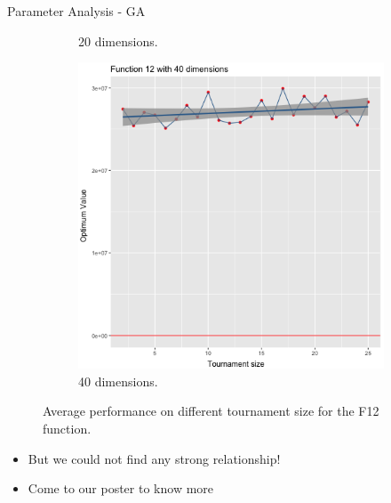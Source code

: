 \documentclass[10pt]{beamer}
\begin{document}
\begin{frame}{Parameter Analysis - GA}
\begin{figure}
\begin{subfigure}[b]{0.3\textwidth}
		\caption{20 dimensions.}
	\end{subfigure}
	\begin{subfigure}[b]{0.3\textwidth}
		\centering
		\includegraphics[width=\textwidth]{12dim_40.png}
		\caption{40 dimensions.}
	\end{subfigure}
	\caption{Average performance on different tournament size for the F12 function.}
	\label{12}
\end{figure}
\begin{itemize}
	\item But we could not find any strong relationship!
	\item Come to our poster to know more
\end{itemize}

\end{frame}

%
%
%
\end{document}
